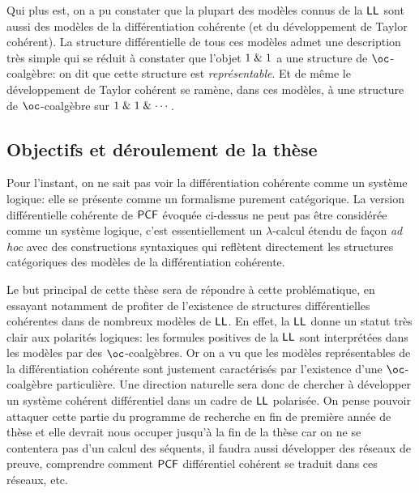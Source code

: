 \documentclass[a4]{article}
\begin{document}
Qui plus est, on a pu constater que la plupart des modèles connus de
la $\hbox{\textsf{LL}}$ sont aussi des modèles de la différentiation cohérente (et du
développement de Taylor cohérent).
%
La structure différentielle de tous ces modèles admet une description
très simple qui se réduit à constater que l'objet ${1}\mathrel{\&}{1}$ a
une structure de $\oc$-coalgèbre: on dit que cette structure est
\emph{représentable}.
%
Et de même le développement de Taylor cohérent se ramène, dans ces
modèles, à une structure de $\oc$-coalgèbre sur
$1\mathrel{\&}1\mathrel{\&}\cdots$.

\subsection*{Objectifs et déroulement de la thèse}
Pour l'instant, on ne sait pas voir la différentiation cohérente comme
un système logique: elle se présente comme un formalisme purement
catégorique.
%
La version différentielle cohérente de $\mathsf{PCF}$ évoquée ci-dessus ne
peut pas être considérée comme un système logique, c'est
essentiellement un $\lambda$-calcul étendu de façon \emph{ad hoc} avec
des constructions syntaxiques qui reflètent directement les structures
catégoriques des modèles de la différentiation cohérente.

Le but principal de cette thèse sera de répondre à cette
problématique, en essayant notamment de profiter de l'existence de
structures différentielles cohérentes dans de nombreux modèles de
$\hbox{\textsf{LL}}$.
%
En effet, la $\hbox{\textsf{LL}}$ donne un statut très clair aux polarités logiques:
les formules positives de la $\hbox{\textsf{LL}}$ sont interprétées dans les modèles
par des $\oc$-coalgèbres.
%
Or on a vu que les modèles représentables de la différentiation
cohérente sont justement caractérisés par l'existence d'une
$\oc$-coalgèbre particulière.
%
Une direction naturelle sera donc de chercher à développer un système
cohérent différentiel dans un cadre de $\hbox{\textsf{LL}}$ polarisée.
%
On pense pouvoir attaquer cette partie du programme de recherche en
fin de première année de thèse et elle devrait nous occuper jusqu'à la
fin de la thèse car on ne se contentera pas d'un calcul des séquents,
il faudra aussi développer des réseaux de preuve, comprendre comment
$\mathsf{PCF}$ différentiel cohérent se traduit dans ces réseaux, etc.
\end{document}
